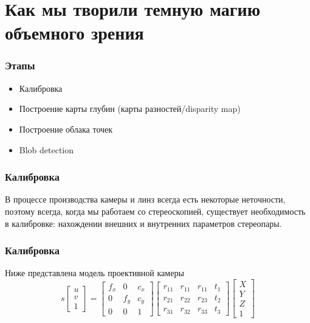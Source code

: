 \documentclass{beamer}
\begin{document}
	\section{Как мы творили темную магию объемного зрения}
		\begin{frame}
			\frametitle{Этапы}
			
			\begin{itemize}
				\item Калибровка
				\item Построение карты глубин (карты разностей/disparity map)
				\item Построение облака точек
				\item Blob detection
			\end{itemize}
		\end{frame}
		
		\begin{frame}
			\frametitle{Калибровка}
			
			В процессе производства камеры и линз всегда есть некоторые неточности,
			поэтому всегда, когда мы работаем со стереоскопией, существует необходимость
			в калибровке: нахождении внешних и внутренних параметров стереопары.
		\end{frame}

		\begin{frame}
			\frametitle{Калибровка}
			
			Ниже представлена модель проективной камеры
			\begin{equation}
			s
			\begin{bmatrix}
			u\\v\\1
			\end{bmatrix}
			=
			\begin{bmatrix}
			f_{x}&0&c_{x}\\
			0&f_{y}&c_{y}\\
			0&0&1
			\end{bmatrix}
			\begin{bmatrix}
			r_{11}&r_{11}&r_{11}&t_{1}\\
			r_{21}&r_{22}&r_{23}&t_{2}\\
			r_{31}&r_{32}&r_{33}&t_{3}
			\end{bmatrix}
			\begin{bmatrix}
			X\\Y\\Z\\1
			\end{bmatrix}
			\end{equation}
		\end{frame}
		
\end{document}
